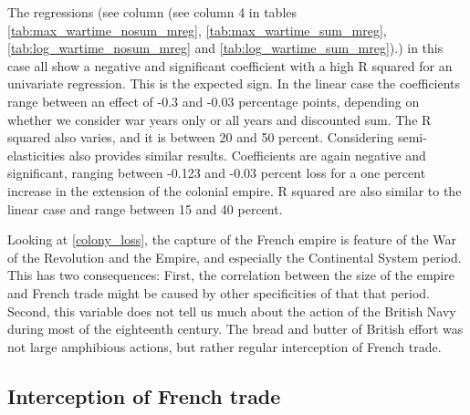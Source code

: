\documentclass[12pt,a4paper,notitlepage,english]{article}
\begin{document}
The regressions (see column (see column 4 in tables \ref{tab:max_wartime_nosum_mreg},  \ref{tab:max_wartime_sum_mreg}, \ref{tab:log_wartime_nosum_mreg} and   \ref{tab:log_wartime_sum_mreg}).) in this case all show a negative and significant coefficient with a high R squared for an univariate regression.
This is the expected sign.
In the linear case the coefficients range between an effect of -0.3 and -0.03 percentage points, depending on whether we consider war years only or all years and discounted sum.
The R squared also varies, and it is between 20 and 50 percent.
Considering semi-elasticities also provides similar results.
Coefficients are again negative and significant, ranging between -0.123 and -0.03 percent loss for a one percent increase in the extension of the colonial empire.
R squared are also similar to the linear case and range between 15 and 40 percent.

Looking at \ref{colony_loss}, the capture of the French empire is feature of the War of the Revolution and the Empire, and especially the Continental System period.
This has two consequences:
First, the correlation between the size of the empire and French trade might be caused by other specificities of that that period.
Second, this variable does not tell us much about the action of the British Navy during most of the eighteenth century.
The bread and butter of British effort was not large amphibious actions, but rather regular interception of French trade.


\subsection{Interception of French trade}
\end{document}
